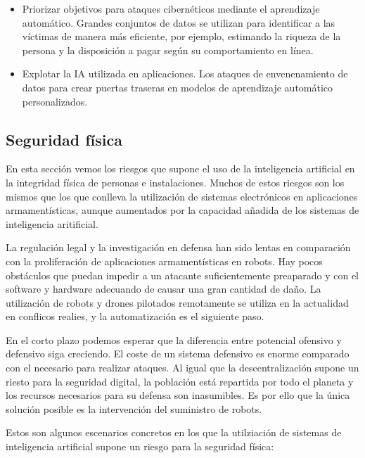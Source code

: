 \documentclass[12pt,a4paper]{article}
\begin{document}
\begin{itemize}
\item Priorizar objetivos para ataques cibernéticos mediante el aprendizaje automático. Grandes conjuntos de datos se utilizan para identificar a las víctimas de manera más eficiente, por ejemplo, estimando la riqueza de la persona y la disposición a pagar según su comportamiento en línea.

\item Explotar la IA utilizada en aplicaciones. Los ataques de envenenamiento de datos para crear puertas traseras en modelos de aprendizaje automático personalizados.

\end{itemize}

\subsection{Seguridad física}

En esta sección vemos los riesgos que supone el uso de la inteligencia artificial en la integridad física de personas e instalaciones. Muchos de estos riesgos son los mismos que los que conlleva la utilización de sistemas electrónicos en aplicaciones armamentísticas, aunque aumentados por la capacidad añadida de los sistemas de inteligencia aritificial.

La regulación legal y la investigación en defensa han sido lentas en comparación con la proliferación de aplicaciones armamentísticas en robots. Hay pocos obstáculos que puedan impedir a un atacante suficientemente preaparado y con el software y hardware adecuando de causar una gran cantidad de daño. La utilización de robots y drones pilotados remotamente se utiliza en la actualidad en conflicos realies, y la automatización es el siguiente paso.

En el corto plazo podemos esperar que la diferencia entre potencial ofensivo y defensivo siga creciendo. El coste de un sistema defensivo es enorme comparado con el necesario para realizar ataques. Al igual que la descentralización supone un riesto para la seguridad digital, la población está repartida por todo el planeta y los recursos necesarios para su defensa son inasumibles. Es por ello que la única solución posible es la intervención del suministro de robots.

Estos son algunos escenarios concretos en los que la utilziación de sistemas de inteligencia artificial supone un riesgo para la seguridad física:
\end{document}
